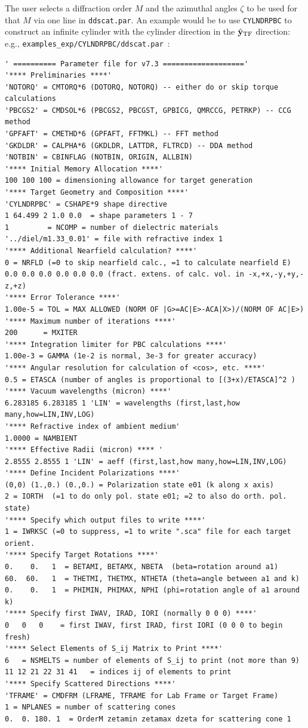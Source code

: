 The user selects a diffraction order $M$ and the azimuthal angles $\zeta$
to be used for that $M$ 
via one line in {\tt ddscat.par}.  An example would be
to use {\tt CYLNDRPBC} to construct an infinite cylinder with the cylinder
direction in the $\hat{\bf y}_{\rm TF}$ direction:
e.g., {\tt examples\_exp/CYLNDRPBC/ddscat.par}~:
{\scriptsize
\begin{verbatim}
' ========== Parameter file for v7.3 ===================' 
'**** Preliminaries ****'
'NOTORQ' = CMTORQ*6 (DOTORQ, NOTORQ) -- either do or skip torque calculations
'PBCGS2' = CMDSOL*6 (PBCGS2, PBCGST, GPBICG, QMRCCG, PETRKP) -- CCG method
'GPFAFT' = CMETHD*6 (GPFAFT, FFTMKL) -- FFT method
'GKDLDR' = CALPHA*6 (GKDLDR, LATTDR, FLTRCD) -- DDA method
'NOTBIN' = CBINFLAG (NOTBIN, ORIGIN, ALLBIN)
'**** Initial Memory Allocation ****'
100 100 100 = dimensioning allowance for target generation
'**** Target Geometry and Composition ****'
'CYLNDRPBC' = CSHAPE*9 shape directive
1 64.499 2 1.0 0.0  = shape parameters 1 - 7
1         = NCOMP = number of dielectric materials
'../diel/m1.33_0.01' = file with refractive index 1
'**** Additional Nearfield calculation? ****'
0 = NRFLD (=0 to skip nearfield calc., =1 to calculate nearfield E)
0.0 0.0 0.0 0.0 0.0 0.0 (fract. extens. of calc. vol. in -x,+x,-y,+y,-z,+z)
'**** Error Tolerance ****'
1.00e-5 = TOL = MAX ALLOWED (NORM OF |G>=AC|E>-ACA|X>)/(NORM OF AC|E>)
'**** Maximum number of iterations ****'
200      = MXITER
'**** Integration limiter for PBC calculations ****'
1.00e-3 = GAMMA (1e-2 is normal, 3e-3 for greater accuracy)
'**** Angular resolution for calculation of <cos>, etc. ****'
0.5	= ETASCA (number of angles is proportional to [(3+x)/ETASCA]^2 )
'**** Vacuum wavelengths (micron) ****'
6.283185 6.283185 1 'LIN' = wavelengths (first,last,how many,how=LIN,INV,LOG)
'**** Refractive index of ambient medium'
1.0000 = NAMBIENT
'**** Effective Radii (micron) **** '
2.8555 2.8555 1 'LIN' = aeff (first,last,how many,how=LIN,INV,LOG)
'**** Define Incident Polarizations ****'
(0,0) (1.,0.) (0.,0.) = Polarization state e01 (k along x axis)
2 = IORTH  (=1 to do only pol. state e01; =2 to also do orth. pol. state)
'**** Specify which output files to write ****'
1 = IWRKSC (=0 to suppress, =1 to write ".sca" file for each target orient.
'**** Specify Target Rotations ****'
0.    0.   1  = BETAMI, BETAMX, NBETA  (beta=rotation around a1)
60.  60.   1  = THETMI, THETMX, NTHETA (theta=angle between a1 and k)
0.    0.   1  = PHIMIN, PHIMAX, NPHI (phi=rotation angle of a1 around k)
'**** Specify first IWAV, IRAD, IORI (normally 0 0 0) ****'
0   0   0    = first IWAV, first IRAD, first IORI (0 0 0 to begin fresh)
'**** Select Elements of S_ij Matrix to Print ****'
6	= NSMELTS = number of elements of S_ij to print (not more than 9)
11 12 21 22 31 41	= indices ij of elements to print
'**** Specify Scattered Directions ****'
'TFRAME' = CMDFRM (LFRAME, TFRAME for Lab Frame or Target Frame)
1 = NPLANES = number of scattering cones
0.  0. 180. 1  = OrderM zetamin zetamax dzeta for scattering cone 1
\end{verbatim}}

